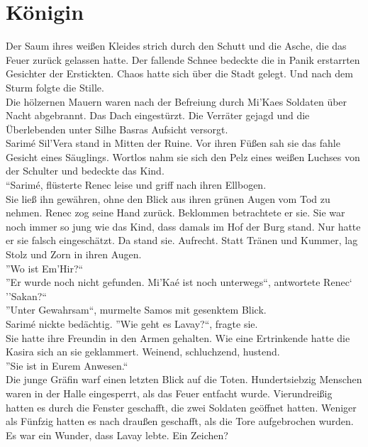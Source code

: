 \chapter{Königin}

Der Saum ihres weißen Kleides strich durch den Schutt und die Asche, die das Feuer zurück gelassen 
hatte. Der fallende Schnee bedeckte die in Panik erstarrten Gesichter der Erstickten. Chaos hatte 
sich über die Stadt gelegt. Und nach dem Sturm folgte die Stille.\\
Die hölzernen Mauern waren nach der Befreiung durch Mi'Kaes Soldaten über Nacht abgebrannt. Das 
Dach eingestürzt. Die Verräter gejagd und die Überlebenden unter Silhe Basras Aufsicht versorgt.\\
Sarimé Sil'Vera stand in Mitten der Ruine. Vor ihren Füßen sah sie das fahle Gesicht eines 
Säuglings. Wortlos nahm sie sich den Pelz eines weißen Luchses von der Schulter und bedeckte das 
Kind.\\
``Sarimé, flüsterte Renec leise und griff nach ihren Ellbogen.\\
Sie ließ ihn gewähren, ohne den Blick aus ihren grünen Augen vom Tod zu nehmen. Renec zog seine 
Hand zurück. Beklommen betrachtete er sie. Sie war noch immer so jung wie das Kind, dass damals im 
Hof der Burg stand. Nur hatte er sie falsch eingeschätzt. Da stand sie. Aufrecht. Statt Tränen und 
Kummer, lag Stolz und Zorn in ihren Augen.\\
''Wo ist Em'Hir?``\\
''Er wurde noch nicht gefunden. Mi'Kaé ist noch unterwegs``, antwortete Renec`\\
''Sakan?``\\
''Unter Gewahrsam``, murmelte Samos mit gesenktem Blick.\\
Sarimé nickte bedächtig. ''Wie geht es Lavay?``, fragte sie.\\
Sie hatte ihre Freundin in den Armen gehalten. Wie eine Ertrinkende hatte die Kasira sich an sie 
geklammert. Weinend, schluchzend, hustend.\\
''Sie ist in Eurem Anwesen.``\\
Die junge Gräfin warf einen letzten Blick auf die Toten. Hundertsiebzig Menschen waren in der Halle 
eingesperrt, als das Feuer entfacht wurde. Vierundreißig hatten es durch die Fenster geschafft, die 
zwei Soldaten geöffnet hatten. Weniger als Fünfzig hatten es nach draußen geschafft, als die Tore 
aufgebrochen wurden. Es war ein Wunder, dass Lavay lebte. Ein Zeichen?\\


